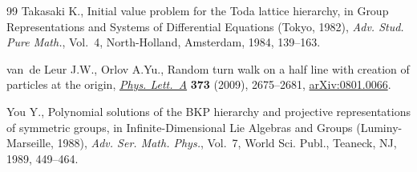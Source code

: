 \documentclass[pdftex]{sigma}
\numberwithin{equation}{section}
\begin{document}
\begin{thebibliography}{99}
Takasaki K., Initial value problem for the {T}oda lattice hierarchy, in Group
  Representations and Systems of Dif\/ferential Equations ({T}okyo, 1982),
  \textit{Adv. Stud. Pure Math.}, Vol.~4, North-Holland, Amsterdam, 1984,
  139--163.

van~de Leur J.W., Orlov A.Yu., Random turn walk on a half line with creation of
  particles at the origin, \href{http://dx.doi.org/10.1016/j.physleta.2009.02.068}{\textit{Phys. Lett.~A}} \textbf{373} (2009),
  2675--2681, \href{http://arxiv.org/abs/0801.0066}{arXiv:0801.0066}.

You Y., Polynomial solutions of the {BKP} hierarchy and projective
  representations of symmetric groups, in Inf\/inite-Dimensional {L}ie Algebras
  and Groups ({L}uminy-{M}arseille, 1988), \textit{Adv. Ser. Math. Phys.},
  Vol.~7, World Sci. Publ., Teaneck, NJ, 1989, 449--464.

\end{thebibliography}\LastPageEnding
\end{document}
